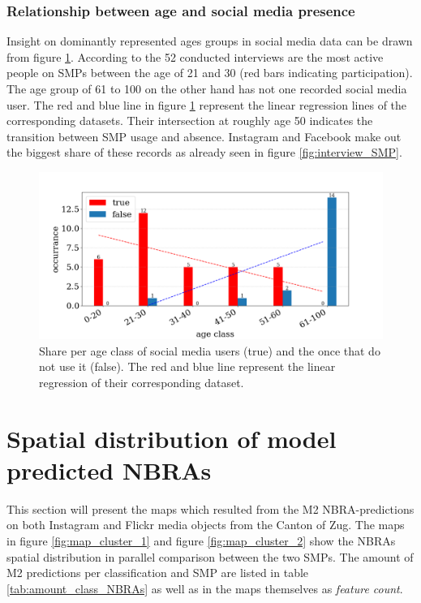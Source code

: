 \subsubsection*{Relationship between age and social media presence}
Insight on dominantly represented ages groups in social media data can be drawn from figure \ref{fig:interview_age_SMP}. According to the 52 conducted interviews are the most active people on SMPs between the age of 21 and 30 (red bars indicating participation). The age group of 61 to 100 on the other hand has not one recorded social media user. The red and blue line in figure \ref{fig:interview_age_SMP} represent the linear regression lines of the corresponding datasets. Their intersection at roughly age 50 indicates the transition between SMP usage and absence. Instagram and Facebook make out the biggest share of these records as already seen in figure \ref{fig:interview_SMP}.

\begin{figure}[h!]
   \centering
   \includegraphics[width=\textwidth]{img/interview_socialmedia_age_bigger_font.pdf}
   \caption{Share per age class of social media users (true) and the once that do not use it (false). The red and blue line represent the linear regression of their corresponding dataset.}
   \label{fig:interview_age_SMP}
\end{figure}

\section{Spatial distribution of model predicted NBRAs}
This section will present the maps which resulted from the M2 NBRA-predictions on both Instagram and Flickr media objects from the Canton of Zug. The maps in figure \ref{fig:map_cluster_1} and figure \ref{fig:map_cluster_2} show the NBRAs spatial distribution in parallel comparison between the two SMPs. The amount of M2 predictions per classification and SMP are listed in table \ref{tab:amount_class_NBRAs} as well as in the maps themselves as \textit{feature count}.

